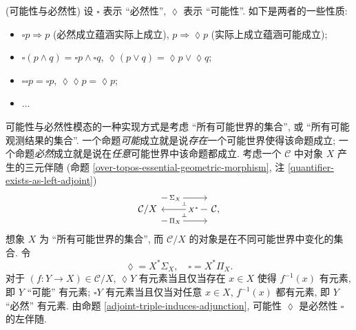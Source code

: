 \begin{example}
	{(可能性与必然性)}
	设 $\square$ 表示 ``必然性'', $\lozenge$ 表示 ``可能性''. 如下是两者的一些性质:
	\begin{itemize}
		\item $\square p \Rightarrow p$ (必然成立蕴涵实际上成立), $p\Rightarrow \lozenge p$ (实际上成立蕴涵可能成立);
		\item $\square (p \land q) = \square p \land \square q$, $\lozenge (p\lor q) = \lozenge p \lor \lozenge q$;
		\item $\square\square p = \square p$, $\lozenge\lozenge p =\lozenge p$;
		\item ...
	\end{itemize}
	可能性与必然性模态的一种实现方式是考虑 ``所有可能世界的集合'', 或 ``所有可能观测结果的集合''. 一个命题\emph{可能}成立就是说\emph{存在}一个可能世界使得该命题成立; 一个命题\emph{必然}成立就是说在\emph{任意}可能世界中该命题都成立.
	考虑一个\topos{} $\mathcal C$ 中对象 $X$ 产生的三元伴随 (命题 \ref{over-topos-essential-geometric-morphism}, 注 \ref{quantifier-exists-as-left-adjoint})
	\[\begin{tikzcd}[ampersand replacement=\&,background color=\examplecolor]
		{\mathcal C/X} \&\& {\mathcal C,}
		\arrow[""{name=0, anchor=center, inner sep=0}, "{X^*}"{description, pos=0.3}, from=1-3, to=1-1]
		\arrow[""{name=1, anchor=center, inner sep=0}, "{\Sigma_X}"{description, pos=0.3}, shift left=5, from=1-1, to=1-3]
		\arrow[""{name=2, anchor=center, inner sep=0}, "{\Pi_X}"{description, pos=0.3}, shift right=5, from=1-1, to=1-3]
		\arrow["\dashv"{anchor=center, rotate=-90}, draw=none, from=1, to=0]
		\arrow["\dashv"{anchor=center, rotate=-90}, draw=none, from=0, to=2]
	\end{tikzcd}\]
	想象 $X$ 为 ``所有可能世界的集合'', 而 $\mathcal C/X$ 的对象是在不同可能世界中变化的集合. 令
	$$
	\lozenge = X^*\Sigma_X,\quad
	\square = X^*\Pi_X.
	$$
	对于 $(f\colon Y\to X) \in \mathcal C/X$, $\lozenge Y$ 有元素当且仅当存在 $x\in X$ 使得 $f^{-1}(x)$ 有元素, 即 $Y$ ``可能'' 有元素; $\square Y$ 有元素当且仅当对任意 $x\in X$, $f^{-1}(x)$ 都有元素, 即 $Y$ ``必然'' 有元素. 由命题 \ref{adjoint-triple-induces-adjunction},  可能性 $\lozenge$ 是必然性 $\square$ 的左伴随.
\end{example}

